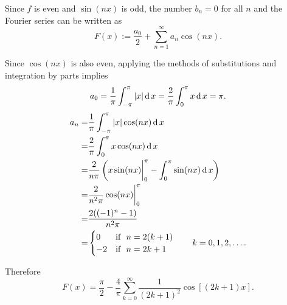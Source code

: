 \begin{solution}

Since $f$ is even and $\sin (nx)$ is odd, the number $b_n=0$ for all $n$ and the Fourier series can be written as
\[F(x):=\frac{a_0}{2}+\sum\limits_{n=1}^\infty a_n\cos(nx).\]

Since $\cos(nx)$ is also even, applying the methods of substitutions and integration by parts implies 
\[a_0=\frac{1}{\pi}\int_{-\pi}^\pi |x|\operatorname{d} x=\frac{2}{\pi}\int_0^\pi x\operatorname{d} x=\pi.\]
\[
  \begin{aligned}
    a_n
    =&\frac{1}{\pi}\int_{-\pi}^\pi |x|\cos(nx)\operatorname{d} x\\
    =&\frac{2}{\pi}\int_0^\pi x\cos(nx) \operatorname{d} x\\
    =&\frac{2}{n\pi}\left(x\sin(nx)\bigg|_0^{\pi}-\int_0^{\pi} \sin(nx) \operatorname{d} x\right)\\
    =&\frac{2}{n^2\pi}\cos(nx)\bigg|_0^\pi\\
    =&\frac{2((-1)^n-1)}{n^2\pi}\\
    =&\begin{cases}
      0 & \text{if }~ n=2(k+1)\\
      -2 & \text{if }~ n=2k+1
    \end{cases} \qquad k=0,1,2,\dots .
  \end{aligned}
\]

Therefore
\[
  F(x)=\frac{\pi}{2}-\frac{4}{\pi}\sum\limits_{k=0}^\infty \frac{1}{(2k+1)^2} \cos[(2k+1)x].
\]
\end{solution}





